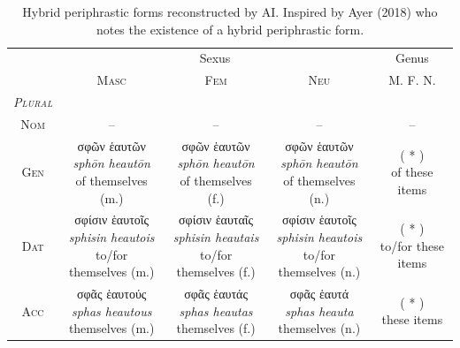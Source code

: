 \documentclass[10pt,a4paper,notitlepage]{article}
\newcommand{\tsc}[1]{\textsc{#1}}
\newcommand*{\grc}[1]{\fontspec{Inter}#1\rmfamily}
\newcommand{\trc}[1]{\textit{\fontspec{Tinos}#1}}
\begin{document}
    \begin{table}[H]
        \begin{tabular}{c|ccc|c}
            & \multicolumn{3}{c|}{Sexus} & Genus \\
            & \tsc{Masc} & \tsc{Fem} & \tsc{Neu} & \tsc{M. F. N.} \\
            \hline
            \emph{\tsc{Plural}} & & & & \\
            \tsc{Nom} & -- & -- & -- & -- \\
            \tsc{Gen} & \makecell{\grc{σφῶν ἑαυτῶν} \\ \trc{sphōn heautōn} \\ \small of themselves (m.)}
                    & \makecell{\grc{σφῶν ἑαυτῶν} \\ \trc{sphōn heautōn} \\ \small of themselves (f.)}
                    & \makecell{\grc{σφῶν ἑαυτῶν} \\ \trc{sphōn heautōn} \\ \small of themselves (n.)}
                    & \makecell{( * ) \\ \small of these items} \\
            \tsc{Dat} & \makecell{\grc{σφίσιν ἑαυτοῖς} \\ \trc{sphisin heautois} \\ \small to/for themselves (m.)}
                    & \makecell{\grc{σφίσιν ἑαυταῖς} \\ \trc{sphisin heautais} \\ \small to/for themselves (f.)}
                    & \makecell{\grc{σφίσιν ἑαυτοῖς} \\ \trc{sphisin heautois} \\ \small to/for themselves (n.)}
                    & \makecell{( * ) \\ \small to/for these items} \\
            \tsc{Acc} & \makecell{\grc{σφᾶς ἑαυτούς} \\ \trc{sphas heautous} \\ \small themselves (m.)}
                    & \makecell{\grc{σφᾶς ἑαυτάς} \\ \trc{sphas heautas} \\ \small themselves (f.)}
                    & \makecell{\grc{σφᾶς ἑαυτά} \\ \trc{sphas heauta} \\ \small themselves (n.)}
                    & \makecell{( * ) \\ \small these items} \\
        \end{tabular}
         \caption{Hybrid periphrastic forms reconstructed by AI. Inspired by Ayer (2018) who notes the existence of a
         hybrid periphrastic form.}
    \end{table}
\end{document}
